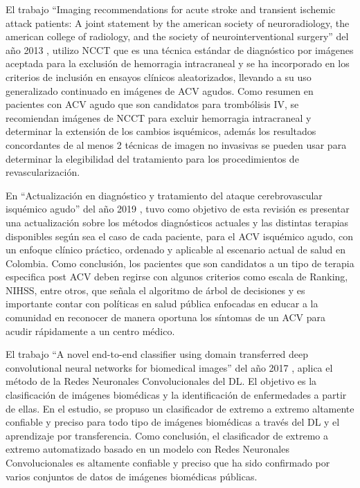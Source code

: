 \par El trabajo “Imaging recommendations for acute stroke and transient ischemic attack patients: A joint statement by the american society of neuroradiology, the american college of radiology, and the society of neurointerventional surgery” del año 2013 \cite{Wintermark2013}, utilizo NCCT que es una técnica estándar de diagnóstico por imágenes aceptada para la exclusión de hemorragia intracraneal y se ha incorporado en los criterios de inclusión en ensayos clínicos aleatorizados, llevando a su uso generalizado continuado en imágenes de ACV  agudos. Como resumen en pacientes con ACV agudo que son candidatos para trombólisis IV, se recomiendan imágenes de NCCT para excluir hemorragia intracraneal y determinar la extensión de los cambios isquémicos, además los resultados concordantes de al menos 2 técnicas de imagen no invasivas se pueden usar para determinar la elegibilidad del tratamiento para los procedimientos de revascularización.\\

\par En “Actualización en diagnóstico y tratamiento del ataque cerebrovascular isquémico agudo” del año 2019 \cite{Garcia2019}, tuvo como objetivo de esta revisión es presentar una actualización sobre los métodos diagnósticos actuales  y  las  distintas  terapias  disponibles según  sea  el  caso  de  cada  paciente,  para  el ACV isquémico agudo, con un enfoque clínico práctico, ordenado y aplicable al escenario actual de salud en Colombia. Como conclusión, los pacientes que son candidatos a un tipo de terapia especifica post ACV deben regirse con algunos criterios como escala de Ranking, NIHSS, entre otros, que señala el algoritmo de árbol de decisiones y es importante contar con políticas en salud pública enfocadas en educar a la comunidad en reconocer de manera oportuna los síntomas de un ACV para acudir rápidamente a un centro médico.\\

\par El trabajo “A novel end-to-end classifier using domain transferred deep convolutional neural networks for biomedical images” del año 2017 \cite{Pang2017}, aplica el método de la Redes Neuronales Convolucionales del DL. El objetivo es la clasificación de imágenes biomédicas y la identificación de enfermedades a partir de ellas. En el estudio, se propuso un clasificador de extremo a extremo altamente confiable y preciso para todo tipo de imágenes biomédicas a través del DL y el aprendizaje por transferencia. Como conclusión, el clasificador de extremo a extremo automatizado basado en un modelo con Redes Neuronales Convolucionales es altamente confiable y preciso que ha sido confirmado por varios conjuntos de datos de imágenes biomédicas públicas.\\

